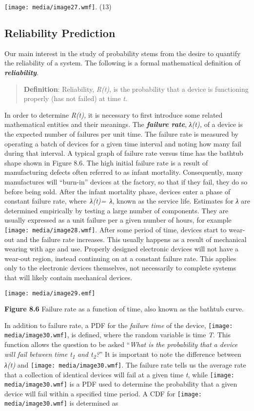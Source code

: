 \texttt{[image: media/image27.wmf]}. (13)

\subsection{Reliability Prediction}\label{reliability-prediction}

Our main interest in the study of probability stems from the desire to
quantify the reliability of a system. The following is a formal
mathematical definition of \emph{\textbf{reliability}}.

\begin{quote}
\textbf{Definition}: Reliability, \emph{R(t)}, is the probability that a
device is functioning properly (has not failed) at time \emph{t}.
\end{quote}

In order to determine \emph{R(t),} it is necessary to first introduce
some related mathematical entities and their meanings. The
\emph{\textbf{failure rate}}, \emph{λ(t),} of a device is the expected
number of failures per unit time. The failure rate is measured by
operating a batch of devices for a given time interval and noting how
many fail during that interval. A typical graph of failure rate versus
time has the bathtub shape shown in Figure 8.6. The high initial failure
rate is a result of manufacturing defects often referred to as infant
mortality. Consequently, many manufactures will ``burn-in'' devices at
the factory, so that if they fail, they do so before being sold. After
the infant mortality phase, devices enter a phase of constant failure
rate, where\emph{~λ(t)=~λ}, known as the service life. Estimates for
\emph{λ} are determined empirically by testing a large number of
components. They are usually expressed as a unit failure per a given
number of hours, for example \texttt{[image: media/image28.wmf]}. After
some period of time, devices start to wear-out and the failure rate
increases. This usually happens as a result of mechanical wearing with
age and use. Properly designed electronic devices will not have a
wear-out region, instead continuing on at a constant failure rate. This
applies only to the electronic devices themselves, not necessarily to
complete systems that will likely contain mechanical devices.

\texttt{[image: media/image29.emf]}

\textbf{Figure 8.6} Failure rate as a function of time, also known as
the bathtub curve.

In addition to failure rate, a PDF for the \emph{failure time} of the
device, \texttt{[image: media/image30.wmf]}, is defined, where the
random variable is time \emph{T}. This function allows the question to
be asked ``\emph{What is the probability that a device will fail between
time t\textsubscript{1} and t\textsubscript{2}?}'' It is important to
note the difference between \emph{λ(t)} and
\texttt{[image: media/image30.wmf]}. The failure rate tells us the
average rate that a collection of identical devices will fail at a given
time \emph{t}, while \texttt{[image: media/image30.wmf]} is a PDF used
to determine the probability that a given device will fail within a
specified time period. A CDF for \texttt{[image: media/image30.wmf]} is
determined as

